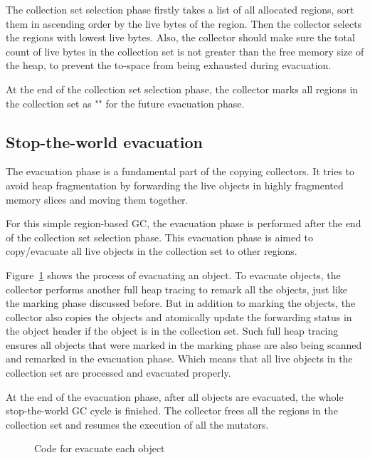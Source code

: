 The collection set selection phase firstly takes a list of all allocated regions,
sort them in ascending order by the live bytes of the region.
Then the collector selects the regions with lowest live bytes.
Also, the collector should make sure the total count of live bytes in the collection set is not
greater than the free memory size of the heap, to prevent the to-space from being exhausted during evacuation.

At the end of the collection set selection phase, the collector marks all regions
in the collection set as "" for the future evacuation phase.

\subsection{Stop-the-world evacuation}

The evacuation phase is a fundamental part of the copying collectors.
It tries to avoid heap fragmentation by forwarding the live objects in highly fragmented memory slices
and moving them together.

For this simple region-based GC, the evacuation phase is performed after the end of the collection set selection phase.
This evacuation phase is aimed to copy/evacuate all live objects in the collection set to other
regions.

Figure~\ref{fig:traceevacuateobject} shows the process of evacuating an object.
To evacuate objects, the collector performs another full heap tracing to remark all the objects,
just like the marking phase discussed before.
But in addition to marking the objects, the collector also copies the objects and atomically update the forwarding status in the object header
if the object is in the collection set.
Such full heap tracing ensures all objects that were marked in the marking phase are also being scanned and remarked in the evacuation phase.
Which means that all live objects in the collection set are processed and evacuated properly.

At the end of the evacuation phase, after all objects are evacuated, the whole stop-the-world GC cycle is finished.
The collector frees all the regions in the collection set and resumes the execution of all the mutators.

\begin{figure}
  \centering
  
  \caption{Code for evacuate each object}
  \label{fig:traceevacuateobject}
\end{figure}

